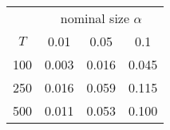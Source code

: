 % 
\begin{tabular}{cccc}
  \hline
  & \multicolumn{3}{c}{nominal size $\alpha$} \\
 $T$ & 0.01 & 0.05 & 0.1 \\
 \hline
100 & 0.003 & 0.016 & 0.045 \\ 
  250 & 0.016 & 0.059 & 0.115 \\ 
  500 & 0.011 & 0.053 & 0.100 \\ 
   \hline
\end{tabular}
